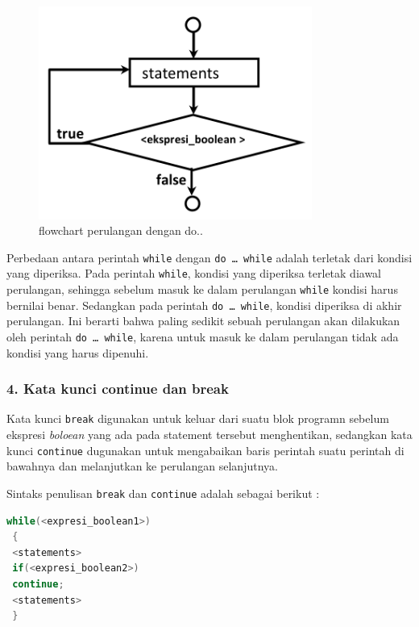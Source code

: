 \begin{figure}[htbp]
\centering
\includegraphics[width=0.8\textwidth]{../manuscript/images/Capture2-10.PNG}
\caption{flowchart perulangan dengan do..}
\end{figure}

Perbedaan antara perintah \texttt{while} dengan
\texttt{do\ \ldots{}\ while} adalah terletak dari kondisi yang
diperiksa. Pada perintah \texttt{while}, kondisi yang diperiksa terletak
diawal perulangan, sehingga sebelum masuk ke dalam perulangan
\texttt{while} kondisi harus bernilai benar. Sedangkan pada perintah
\texttt{do\ \ldots{}\ while}, kondisi diperiksa di akhir perulangan. Ini
berarti bahwa paling sedikit sebuah perulangan akan dilakukan oleh
perintah \texttt{do\ \ldots{}\ while}, karena untuk masuk ke dalam
perulangan tidak ada kondisi yang harus dipenuhi.

\subsubsection{4. Kata kunci continue dan break}\label{kata-kunci-continue-dan-break}

Kata kunci \texttt{break} digunakan untuk keluar dari suatu blok
programn sebelum ekspresi \emph{boloean} yang ada pada statement
tersebut menghentikan, sedangkan kata kunci \texttt{continue} dugunakan
untuk mengabaikan baris perintah suatu perintah di bawahnya dan
melanjutkan ke perulangan selanjutnya.

Sintaks penulisan \texttt{break} dan \texttt{continue} adalah sebagai
berikut :

\begin{lstlisting}[language=c++, numbers=none]
 while(<expresi_boolean1>)
 {
 <statements>
 if(<expresi_boolean2>)
 continue;
 <statements>
 }
\end{lstlisting}
